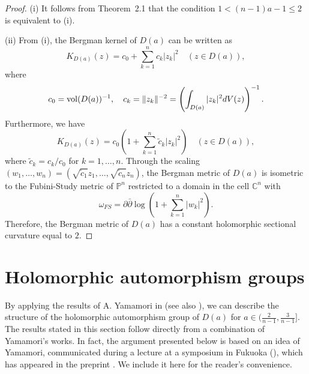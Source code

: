 \documentclass[12pt]{amsart}
\numberwithin{equation}{section}
\theoremstyle{definition}
\theoremstyle{remark}
\newcommand{\C}{{\mathbb C}}
\newcommand{\PP}{{\mathbb P}}
\newcommand{\1}{{\bf 1}}
\begin{document}
\begin{proof}

(i) \;\; It follows from Theorem~2.1 that 
the condition 
$1<(n-1)a-1\leq 2$ is equivalent to (i). 

(ii) \;\;
From (i), 
the Bergman kernel of $D(a)$ can be written
as 
\begin{equation}\label{eqn:3.1}
K_{D(a)}(z)=c_0+\sum_{k=1}^n c_k |z_k|^2
\quad (z\in D(a)), 
\end{equation}
where 
$$
c_0={\rm vol} (D(a))^{-1}, 
\quad 
c_k=\|z_k\|^{-2}=
\left(\int_{D(a)} |z_k|^2 dV(z)\right)^{-1}.$$ 
Furthermore, we have
$$
K_{D(a)}(z)=
c_0\left(1+\sum_{k=1}^n \tilde{c}_k |z_k|^2\right)
\quad (z\in D(a)),
$$ 
where $\tilde{c}_k=c_k/c_0$ for
$k=1,\ldots,n$. 
Through
the scaling $(w_1,\ldots,w_n)=
(\sqrt{\tilde{c}_1}z_1,\ldots,
\sqrt{\tilde{c}_n}z_n)$,
the Bergman metric of $D(a)$ 
is isometric to the Fubini-Study metric
of $\PP^n$ restricted to 
a domain in the cell $\C^n$ with 
$$
\omega_{FS} =
\partial\bar{\partial} \log 
\left(
1+\sum_{k=1}^n |w_k|^2
\right). 
$$
Therefore, the Bergman metric of $D(a)$ 
has a constant holomorphic 
sectional curvature equal 
to $2$.
\end{proof}


\section{Holomorphic automorphism groups}

By applying the results of A. Yamamori in 
\cite{Yam14, Yam15, Yam17}
(see also \cite{KNY14}), 
we can describe the structure of the holomorphic 
automorphism group of $D(a)$ for
$a\in(\frac{2}{n-1},\frac{3}{n-1}]$. 
The results stated in this section follow directly
from a combination of Yamamori's works.
In fact, 
the argument presented below is based on an idea of 
Yamamori, 
communicated during a lecture at a symposium 
in Fukuoka (\cite{Yam25lecture}), 
which has appeared in the preprint \cite{Yam25}. 
We include it here for the reader's convenience. 
\end{document}
